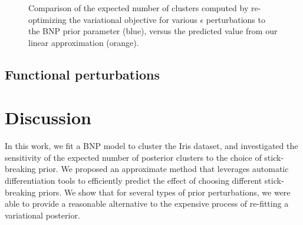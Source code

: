 \documentclass[a4paper]{article}
\begin{document}
\begin{figure}[h!]
\begin{subfigure}[t]{0.4\textwidth}
	\end{subfigure}
	\caption{Comparison of the expected number of clusters computed by re-optimizing
  the variational objective for various $\epsilon$ perturbations to the BNP prior parameter
  (blue),
  versus the predicted value from our linear approximation (orange). }
	\label{fig:parametric_sens_e_num_clusters}
\end{figure}


\subsection{Functional perturbations}

\section{Discussion}
In this work, we fit a BNP model to cluster the Iris dataset, and
investigated the sensitivity of the expected number of
posterior clusters to the choice of stick-breaking prior. We proposed an approximate
method that leverages automatic differentiation tools
to efficiently predict the effect of choosing different stick-breaking priors. We show
that for several types of prior perturbations, we were able to provide a reasonable
alternative to the expensive process of re-fitting a variational posterior.
\end{document}
